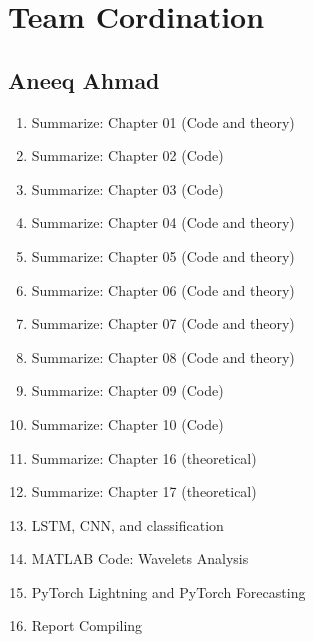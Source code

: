 \documentclass{article}
\begin{document}
\section{Team Cordination}

\subsection{Aneeq Ahmad}
\begin{enumerate}
    \item Summarize: Chapter 01 (Code and theory)
    \item Summarize: Chapter 02 (Code)
    \item Summarize: Chapter 03 (Code)
    \item Summarize: Chapter 04 (Code and theory)
    \item Summarize: Chapter 05 (Code and theory)
    \item Summarize: Chapter 06 (Code and theory)
    \item Summarize: Chapter 07 (Code and theory)
    \item Summarize: Chapter 08 (Code and theory)
    \item Summarize: Chapter 09 (Code)
    \item Summarize: Chapter 10 (Code)
    \item Summarize: Chapter 16 (theoretical)
    \item Summarize: Chapter 17 (theoretical)
    \item LSTM, CNN, and classification
    \item MATLAB Code: Wavelets Analysis
    \item PyTorch Lightning and PyTorch Forecasting
    \item Report Compiling
\end{enumerate}
\end{document}
